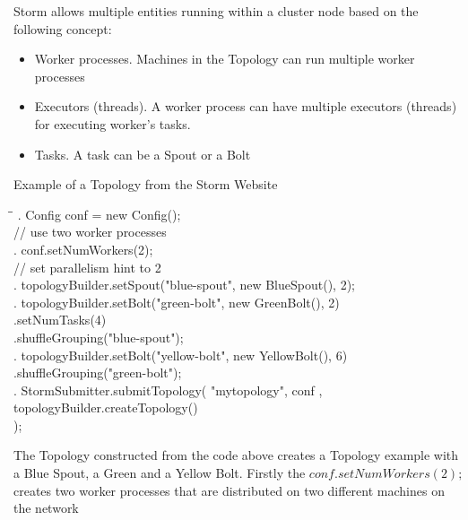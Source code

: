 \documentclass{lmproj}
\begin{document}
Storm allows multiple entities running within a cluster node based on the following concept:

\begin{itemize}
	\item Worker processes. Machines in the Topology can run multiple worker processes 
	\item Executors (threads). A worker process can have multiple executors (threads) for executing worker’s tasks.
	\item Tasks. A task can be a Spout or a Bolt
\end{itemize}

Example of a Topology from the Storm Website

\begin{tabbing}
	\hspace*{2cm}\=\hspace*{1cm}\= \kill
	. \> Config conf = new Config(); \\
	\>    \> // use two worker processes  \\
	. \> conf.setNumWorkers(2); \\
	\>    \> // set parallelism hint to 2 \\
	. \> topologyBuilder.setSpout("blue-spout", new BlueSpout(), 2); \\
	. \> topologyBuilder.setBolt("green-bolt", new GreenBolt(), 2) \\
	\>    \>  \hspace*{2cm} .setNumTasks(4) \\
	\>    \>  \hspace*{2cm} .shuffleGrouping("blue-spout"); \\
	. \> topologyBuilder.setBolt("yellow-bolt", new YellowBolt(), 6) \\
	\>    \>  \hspace*{2cm} .shuffleGrouping("green-bolt"); \\
	. \> StormSubmitter.submitTopology(  "mytopology", conf , \\
	\>    \>  \hspace*{2cm} topologyBuilder.createTopology() \\
	\>    \>  \hspace*{2cm} ); \\
		
\end{tabbing}

The Topology constructed from the code above creates a Topology example with a Blue Spout, a Green and a Yellow Bolt. Firstly the $conf.setNumWorkers(2);$ \space [2] creates two worker processes that are distributed on two different machines on the network
\end{document}
